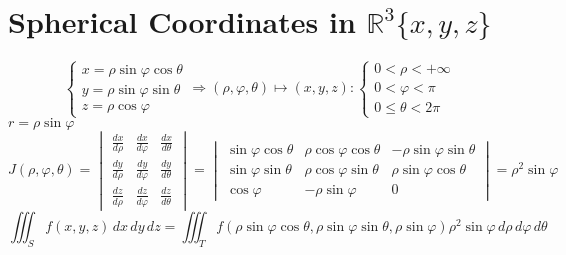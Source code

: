 \documentclass[12pt]{article}
\newcommand{\BR}{\mathbb R}
\newcommand{\phii}{\varphi}
\begin{document}
\section*{Spherical Coordinates in $\BR^3\{x,y,z\}$}
    \[
        \begin{cases}
            x=\rho\sin\phii\cos\theta \\
            y=\rho\sin\phii\sin\theta \\
            z=\rho\cos\phii
        \end{cases}
        \Rightarrow (\rho,\phii,\theta)\mapsto(x,y,z):
        \begin{cases}
            0<\rho<+\infty \\
            0<\phii<\pi \\
            0\leq\theta<2\pi
        \end{cases}
    \]
    $r=\rho\sin\phii$ \\
    \[
        J(\rho,\phii,\theta)=
        \begin{vmatrix*}
            \frac{dx}{d\rho} & \frac{dx}{d\phii} & \frac{dx}{d\theta} \\
            \frac{dy}{d\rho} & \frac{dy}{d\phii} & \frac{dy}{d\theta} \\
            \frac{dz}{d\rho} & \frac{dz}{d\phii} & \frac{dz}{d\theta}
        \end{vmatrix*}
        =
        \begin{vmatrix*}
            \sin\phii\cos\theta & \rho\cos\phii\cos\theta & -\rho\sin\phii\sin\theta \\
            \sin\phii\sin\theta & \rho\cos\phii\sin\theta & \rho\sin\phii\cos\theta \\
            \cos\phii & -\rho\sin\phii & 0
        \end{vmatrix*}
        = \rho^2\sin\phii   
    \]
    \[ \iiint_Sf(x,y,z)\,dx\,dy\,dz=\iiint_Tf(\rho\sin\phii\cos\theta,\rho\sin\phii\sin\theta,\rho\sin\phii)\rho^2\sin\phii\,d\rho\,d\phii\,d\theta \]
\end{document}
